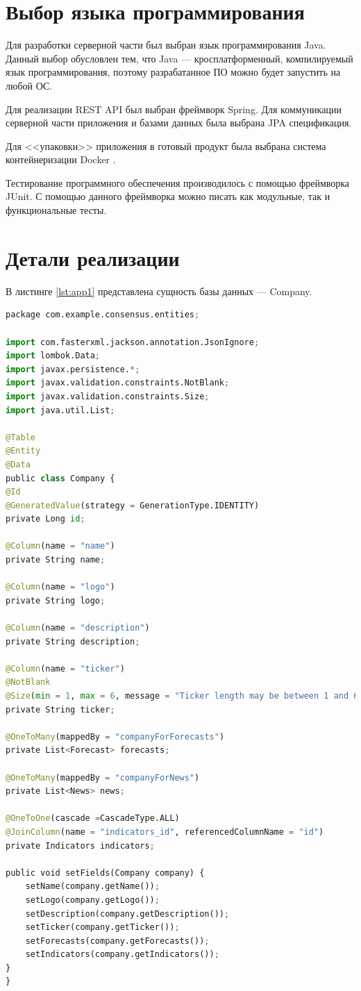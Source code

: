 \section{Выбор языка программирования}
Для разработки серверной части был выбран язык программирования Java. Данный выбор обусловлен тем, что Java --- кросплатформенный, компилируемый язык программирования, поэтому разрабатанное ПО можно будет запустить на любой ОС.  

Для реализации REST API был выбран фреймворк Spring. Для коммуникации  серверной части приложения и базами данных была выбрана JPA спецификация.   

Для <<упаковки>> приложения в готовый продукт была выбрана система контейнеризации Docker \cite{8}.  

Тестирование программного обеспечения производилось с помощью фреймворка JUnit. С помощью данного фреймворка можно писать как модульные, так и функциональные тесты.  


\section{Детали реализации}

\newpage
В листинге \ref{lst:app1} представлена сущность базы данных --- Company.


\begin{lstlisting}[label=lst:app1, caption=Сущность Company, language=python]
package com.example.consensus.entities;

import com.fasterxml.jackson.annotation.JsonIgnore;
import lombok.Data;
import javax.persistence.*;
import javax.validation.constraints.NotBlank;
import javax.validation.constraints.Size;
import java.util.List;

@Table
@Entity
@Data
public class Company {
@Id
@GeneratedValue(strategy = GenerationType.IDENTITY)
private Long id;

@Column(name = "name")
private String name;

@Column(name = "logo")
private String logo;

@Column(name = "description")
private String description;

@Column(name = "ticker")
@NotBlank
@Size(min = 1, max = 6, message = "Ticker length may be between 1 and 6")
private String ticker;

@OneToMany(mappedBy = "companyForForecasts")
private List<Forecast> forecasts;

@OneToMany(mappedBy = "companyForNews")
private List<News> news;

@OneToOne(cascade =CascadeType.ALL)
@JoinColumn(name = "indicators_id", referencedColumnName = "id")
private Indicators indicators;

public void setFields(Company company) {
	setName(company.getName());
	setLogo(company.getLogo());
	setDescription(company.getDescription());
	setTicker(company.getTicker());
	setForecasts(company.getForecasts());
	setIndicators(company.getIndicators());
}
}	
\end{lstlisting}
\newpage

